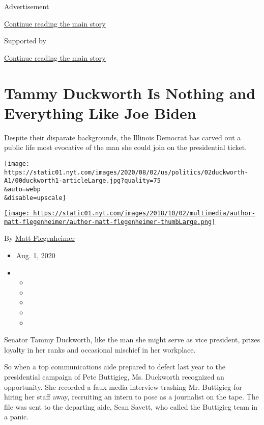Advertisement

\protect\hyperlink{after-top}{Continue reading the main story}

Supported by

\protect\hyperlink{after-sponsor}{Continue reading the main story}

\hypertarget{tammy-duckworth-is-nothing-and-everything-like-joe-biden}{%
\section{Tammy Duckworth Is Nothing and Everything Like Joe
Biden}\label{tammy-duckworth-is-nothing-and-everything-like-joe-biden}}

Despite their disparate backgrounds, the Illinois Democrat has carved
out a public life most evocative of the man she could join on the
presidential ticket.

\texttt{[image: https://static01.nyt.com/images/2020/08/02/us/politics/02duckworth-A1/00duckworth1-articleLarge.jpg?quality=75\\\&auto=webp\\\&disable=upscale]}

\href{https://www.nytimes.com/by/matt-flegenheimer}{\texttt{[image: https://static01.nyt.com/images/2018/10/02/multimedia/author-matt-flegenheimer/author-matt-flegenheimer-thumbLarge.png]}}

By \href{https://www.nytimes.com/by/matt-flegenheimer}{Matt
Flegenheimer}

\begin{itemize}
\item
  Aug. 1, 2020
\item
  \begin{itemize}
  \item
  \item
  \item
  \item
  \item
  \end{itemize}
\end{itemize}

Senator Tammy Duckworth, like the man she might serve as vice president,
prizes loyalty in her ranks and occasional mischief in her workplace.

So when a top communications aide prepared to defect last year to the
presidential campaign of Pete Buttigieg, Ms. Duckworth recognized an
opportunity. She recorded a faux media interview trashing Mr. Buttigieg
for hiring her staff away, recruiting an intern to pose as a journalist
on the tape. The file was sent to the departing aide, Sean Savett, who
called the Buttigieg team in a panic.

